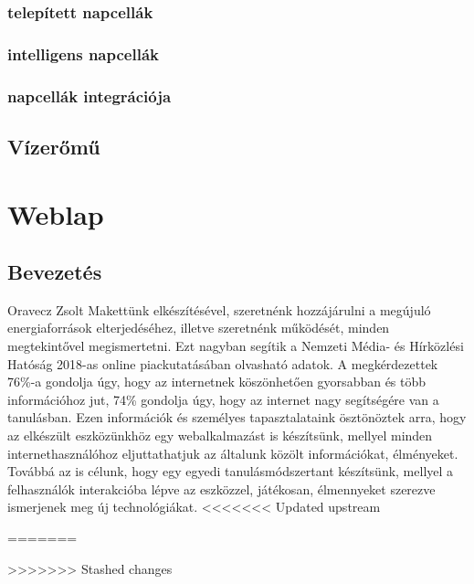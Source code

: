 \documentclass[
]{thesis-ekf}
\theoremstyle{definition}
\theoremstyle{remark}
\begin{document}
 		\subsection{telepített napcellák}
 		\subsection{intelligens napcellák}
 		\subsection{napcellák integrációja}
 	\section{Vízerőmű}
 	
 	

	
	
		

\chapter{Weblap}
	\section{Bevezetés}
	Oravecz Zsolt
		Makettünk elkészítésével, szeretnénk hozzájárulni a megújuló energiaforrások elterjedéséhez, illetve szeretnénk működését, minden megtekintővel megismertetni. Ezt nagyban segítik a Nemzeti Média- és Hírközlési Hatóság 2018-as online piackutatásában olvasható adatok. A megkérdezettek 76\%-a gondolja úgy, hogy az internetnek köszönhetően gyorsabban és több információhoz jut, 74\% gondolja úgy, hogy az internet nagy segítségére van a tanulásban. \cite{NMHHlakossagi}  Ezen információk és személyes tapasztalataink ösztönöztek arra, hogy az elkészült eszközünkhöz egy webalkalmazást is készítsünk, mellyel minden internethasználóhoz eljuttathatjuk az általunk közölt információkat, élményeket. Továbbá az is célunk, hogy egy egyedi tanulásmódszertant készítsünk, mellyel a felhasználók interakcióba lépve az eszközzel, játékosan, élmennyeket szerezve ismerjenek meg új technológiákat. 
<<<<<<< Updated upstream
		
		
=======
		
		
>>>>>>> Stashed changes
\end{document}
